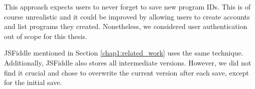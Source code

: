 This approach expects users to never forget to save new program IDs. This is of course unrealistic and it could be improved by allowing users
to create accounts and list programs they created. Nonetheless, we considered user authentication out of scope for this thesis.

JSFiddle mentioned in Section \ref{chap1:related_work} uses the same technique. Additionally, JSFiddle also stores all intermediate versions. However,
we did not find it crucial and chose to overwrite the current version after each save, except for the initial save.
